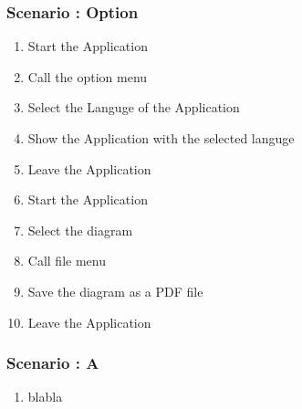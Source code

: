 \subsubsection {Scenario : Option} 

\begin{enumerate}

\item Start the Application

\item Call the option menu

\item Select the Languge of the Application

\item Show the Application with the selected languge

\item Leave the Application

\item Start the Application 

\item Select the diagram 

\item Call file menu

\item Save the diagram as a PDF file

\item Leave the Application

\end{enumerate}

\subsubsection {Scenario : A} 

\begin{enumerate}

\item blabla

\end{enumerate}
